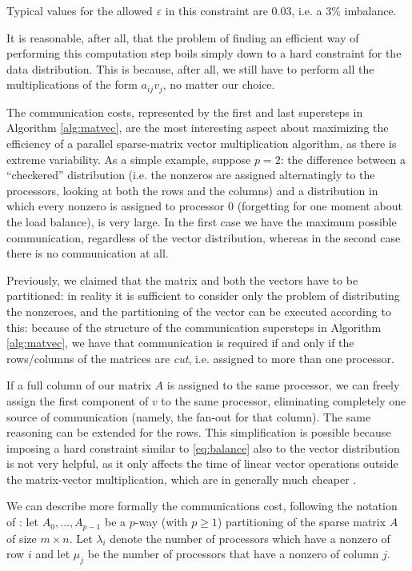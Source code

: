 Typical values for the allowed $\varepsilon$ in this constraint are 0.03, i.e. a 3\% imbalance.

It is reasonable, after all, that the problem of finding an efficient way of performing this computation step boils simply down to a hard constraint for the data distribution. This is because, after all, we still have to perform all the multiplications of the form $a_{ij} v_j$, no matter our choice. 

The communication costs, represented by the first and last supersteps in Algorithm \ref{alg:matvec}, are the most interesting aspect about maximizing the efficiency of a parallel sparse-matrix vector multiplication algorithm, as there is extreme variability. As a simple example, suppose $p=2$: the difference between a ``checkered'' distribution (i.e. the nonzeros are assigned alternatingly to the processors, looking at both the rows and the columns) and a distribution in which every nonzero is assigned to processor 0 (forgetting for one moment about the load balance), is very large. In the first case we have the maximum possible communication, regardless of the vector distribution, whereas in the second case there is no communication at all.

Previously, we claimed that the matrix and both the vectors have to be partitioned: in reality it is sufficient to consider only the problem of distributing the nonzeroes, and the partitioning of the vector can be executed according to this: because of the structure of the communication supersteps in Algorithm \ref{alg:matvec}, we have that communication is required if and only if the rows/columns of the matrices are \emph{cut}, i.e. assigned to more than one processor.

If a full column of our matrix $A$ is assigned to the same processor, we can freely assign the first component of $v$ to the same processor, eliminating completely one source of communication (namely, the fan-out for that column). The same reasoning can be extended for the rows. This simplification is possible because imposing a hard constraint similar to \eqref{eq:balance} also to the vector distribution is not very helpful, as it only affects the time of linear vector operations outside the matrix-vector multiplication, which are in generally much cheaper \cite[Sec.~3]{mondriaan}. 

We can describe more formally the communications cost, following the notation of \cite[Def.~2.1]{mondriaan}: let $A_0,\dots,A_{p-1}$ be a $p$-way (with $p \geq 1$) partitioning of the sparse matrix $A$ of size $m \times n$. Let $\lambda_i$ denote the number of processors which have a nonzero of row $i$ and let $\mu_j$ be the number of processors that have a nonzero of column $j$.

